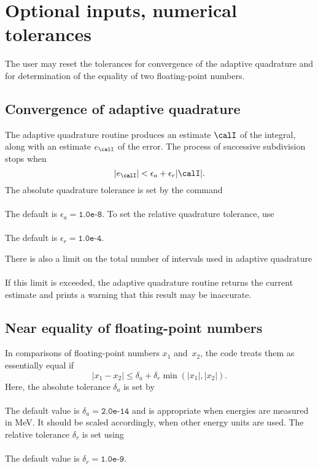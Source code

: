\section{Optional inputs, numerical tolerances}
The user may reset the tolerances for convergence of the adaptive quadrature
and for determination of the equality of two floating-point numbers.

\subsection{Convergence of adaptive quadrature}
The adaptive quadrature routine produces an estimate $\calI$ of
the integral, along with an estimate $e_\calI$ of the error.  The process of
successive subdivision stops when
$$
  | e_\calI | < \epsilon_a + \epsilon_r | \calI |.
$$
The absolute quadrature tolerance is set by the command\\
  \\
The default is $\epsilon_a = \texttt{1.0e-8}$.  To set the relative
quadrature tolerance, use\\
  \\
The default is $\epsilon_r = \texttt{1.0e-4}$. 

There is also a limit on the total number of intervals used in
adaptive quadrature\\
  \\
If this limit is exceeded, the adaptive quadrature routine returns
the current estimate and prints a warning that this result may be
inaccurate.

\subsection{Near equality of floating-point numbers}
In comparisons of floating-point numbers $x_1$ and~$x_2$, the code treats 
them as essentially equal if
$$
  | x_1 - x_2 | \le \delta_a + \delta_r \min( | x_1 |, | x_2 | ).
$$
Here, the absolute tolerance $\delta_a$ is set by\\
  \\
The default value is $\delta_a = \texttt{2.0e-14}$ and is appropriate
when energies are measured in MeV.  It should be scaled accordingly,
when other energy units are used.  The relative tolerance
$\delta_r$ is set using\\
  \\
The default value is $\delta_r = \texttt{1.0e-9}$.


